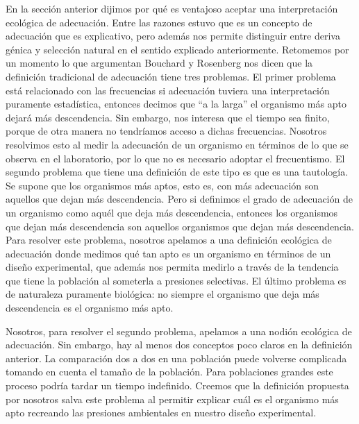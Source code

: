  En la sección anterior dijimos por qué es ventajoso aceptar una interpretación ecológica de adecuación. Entre las razones estuvo que es un concepto de adecuación que es explicativo, pero además nos permite distinguir entre deriva génica y selección natural en el sentido explicado anteriormente. Retomemos por un momento lo que argumentan Bouchard y Rosenberg \citeyear{Bouchard2004} nos dicen que la definición tradicional de adecuación tiene tres problemas. El primer problema está relacionado con las frecuencias si adecuación tuviera una interpretación puramente estadística, entonces decimos que ``a la larga'' el organismo más apto dejará más descendencia. Sin embargo, nos interesa que el tiempo sea finito, porque de otra manera no tendríamos acceso a dichas frecuencias. Nosotros resolvimos esto al medir la adecuación de un organismo en términos de lo que se observa en el laboratorio, por lo que no es necesario adoptar el frecuentismo. El segundo problema que tiene una definición de este tipo es que es una tautología. Se supone que los organismos más aptos, esto es, con más adecuación son aquellos que dejan más descendencia. Pero si definimos el grado de adecuación de un organismo como aquél que deja más descendencia, entonces los organismos que dejan más descendencia son aquellos organismos que dejan más descendencia. Para resolver este problema, nosotros apelamos a una definición ecológica de adecuación donde medimos qué tan apto es un organismo en términos de un diseño experimental, que además nos permita medirlo a través de la tendencia que tiene la población al someterla a presiones selectivas. El último problema es de naturaleza puramente biológica: no siempre el organismo que deja más descendencia es el organismo más apto.

 Nosotros, para resolver el segundo problema, apelamos a una nodión ecológica de adecuación. Sin embargo, hay al menos dos conceptos poco claros en la definición anterior. La comparación dos a dos en una población puede volverse complicada tomando en cuenta el tamaño de la población. Para poblaciones grandes este proceso podría tardar un tiempo indefinido. Creemos que la definición propuesta por nosotros salva este problema al permitir explicar cuál es el organismo más apto recreando las presiones ambientales en nuestro diseño experimental.

